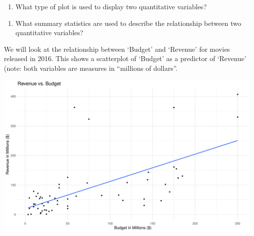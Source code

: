 \documentclass[
]{report}
\newenvironment{Shaded}{\begin{snugshade}}{\end{snugshade}}
\newcommand{\CommentTok}[1]{\textcolor[rgb]{0.56,0.35,0.01}{\textit{#1}}}
\newcommand{\DataTypeTok}[1]{\textcolor[rgb]{0.13,0.29,0.53}{#1}}
\newcommand{\KeywordTok}[1]{\textcolor[rgb]{0.13,0.29,0.53}{\textbf{#1}}}
\newcommand{\NormalTok}[1]{#1}
\newcommand{\OperatorTok}[1]{\textcolor[rgb]{0.81,0.36,0.00}{\textbf{#1}}}
\newcommand{\OtherTok}[1]{\textcolor[rgb]{0.56,0.35,0.01}{#1}}
\newcommand{\StringTok}[1]{\textcolor[rgb]{0.31,0.60,0.02}{#1}}
\providecommand{\tightlist}{%
  \setlength{\itemsep}{0pt}\setlength{\parskip}{0pt}}
\begin{document}
\begin{enumerate}
\def\labelenumi{\arabic{enumi}.}
\tightlist
\item
  What type of plot is used to display two quantitative variables?
\end{enumerate}

\vspace{0.2in}

\begin{enumerate}
\def\labelenumi{\arabic{enumi}.}
\setcounter{enumi}{1}
\tightlist
\item
  What summary statistics are used to describe the relationship between two quantitative variables?
\end{enumerate}

\vspace{0.3in}

We will look at the relationship between `Budget' and `Revenue' for movies released in 2016. This shows a scatterplot of `Budget' as a predictor of `Revenue' (note: both variables are measures in ``millions of dollars''.

\begin{Shaded}
\end{Shaded}

\begin{center}\includegraphics[width=0.7\linewidth]{05-EDA-multivariate_files/figure-latex/unnamed-chunk-2-1} \end{center}
\end{document}
